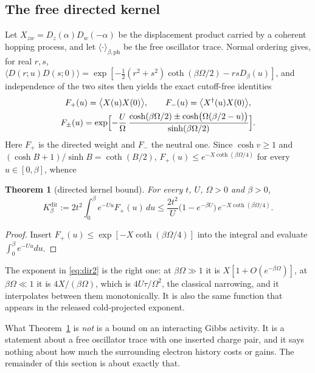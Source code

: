 \documentclass[11pt]{article}
\newtheorem{theorem}{Theorem}[section]
\theoremstyle{definition}
\theoremstyle{remark}
\newcommand{\Dir}{K_{\beta}^{\mathrm{dir}}}
\begin{document}
\subsection{The free directed kernel}

Let $X_{zw}=D_{z}(\alpha)D_{w}(-\alpha)$ be the displacement product carried by a
coherent hopping process, and let $\langle\cdot\rangle_{\beta,\mathrm{ph}}$ be
the free oscillator trace. Normal ordering gives, for real $r,s$,
$\langle D(r;u)D(s;0)\rangle=\exp[-\tfrac12(r^{2}+s^{2})\coth(\beta\Omega/2)-rsD_{\beta}(u)]$,
and independence of the two sites then yields the exact cutoff-free identities
\begin{equation}
\begin{gathered}
F_{+}(u)=\bigl\langle X(u)X(0)\bigr\rangle,\qquad
F_{-}(u)=\bigl\langle X^{\dagger}(u)X(0)\bigr\rangle,\\
F_{\pm}(u)=\exp\Bigl[-\frac U\Omega\,
\frac{\cosh(\beta\Omega/2)\pm\cosh\bigl(\Omega(\beta/2-u)\bigr)}{\sinh(\beta\Omega/2)}\Bigr].
\end{gathered}
\label{eq:Fpm}
\end{equation}
Here $F_{+}$ is the directed weight and $F_{-}$ the neutral one. Since
$\cosh v\ge1$ and $(\cosh B+1)/\sinh B=\coth(B/2)$,
$F_{+}(u)\le e^{-X\coth(\beta\Omega/4)}$ for every $u\in[0,\beta]$, whence

\begin{theorem}[directed kernel bound]
\label{thm:dir}
For every $t$, $U$, $\Omega>0$ and $\beta>0$,
\begin{equation}
\Dir:=2t^{2}\int_{0}^{\beta}e^{-Uu}F_{+}(u)\,du
\le\frac{2t^{2}}{U}\bigl(1-e^{-\beta U}\bigr)\,e^{-X\coth(\beta\Omega/4)} .
\label{eq:dir2}
\end{equation}
\end{theorem}

\begin{proof}
Insert $F_{+}(u)\le\exp[-X\coth(\beta\Omega/4)]$ into the integral and evaluate
$\int_{0}^{\beta}e^{-Uu}du$.
\end{proof}

The exponent in \eqref{eq:dir2} is the right one: at $\beta\Omega\gg1$ it is
$X[1+O(e^{-\beta\Omega})]$, at $\beta\Omega\ll1$ it is $4X/(\beta\Omega)$, which
is $4U\tau/\Omega^{2}$, the classical narrowing, and it interpolates between them
monotonically. It is also the same function that appears in the released
cold-projected exponent.

What Theorem~\ref{thm:dir} is \emph{not} is a bound on an interacting Gibbs
activity. It is a statement about a free oscillator trace with one inserted
charge pair, and it says nothing about how much the surrounding electron history
costs or gains. The remainder of this section is about exactly that.
\end{document}
